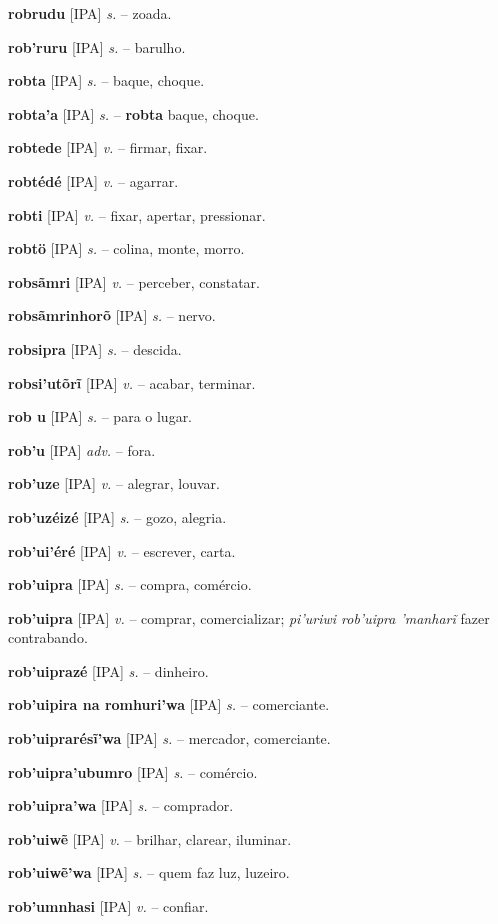 \textbf{robrudu} [IPA] \textit{s.} -- zoada.

\textbf{rob'ruru} [IPA] \textit{s.} -- barulho.

\textbf{robta} [IPA] \textit{s.} -- baque, choque.

\textbf{robta'a} [IPA] \textit{s.} -- \textbf{robta} baque, choque.

\textbf{robtede} [IPA] \textit{v.} -- firmar, fixar.

\textbf{robtédé} [IPA] \textit{v.} -- agarrar.

\textbf{robti} [IPA] \textit{v.} -- fixar, apertar, pressionar.

\textbf{robtö} [IPA] \textit{s.} -- colina, monte, morro.

\textbf{robsãmri} [IPA] \textit{v.} -- perceber, constatar.

\textbf{robsãmrinhorõ} [IPA] \textit{s.} -- nervo.

\textbf{robsipra} [IPA] \textit{s.} -- descida.

\textbf{robsi'utõrĩ} [IPA] \textit{v.} -- acabar, terminar.

\textbf{rob u} [IPA] \textit{s.} -- para o lugar.

\textbf{rob'u} [IPA] \textit{adv.} -- fora.

\textbf{rob'uze} [IPA] \textit{v.} -- alegrar, louvar.

\textbf{rob'uzéizé} [IPA] \textit{s.} -- gozo, alegria.

\textbf{rob'ui'éré} [IPA] \textit{v.} -- escrever, carta.

\textbf{rob'uipra} [IPA] \textit{s.} -- compra, comércio.

\textbf{rob'uipra} [IPA] \textit{v.} -- comprar, comercializar; \textit{pi'uriwi rob'uipra 'manharĩ} fazer contrabando.

\textbf{rob'uiprazé} [IPA] \textit{s.} -- dinheiro.

\textbf{rob'uipira na romhuri'wa} [IPA] \textit{s.} -- comerciante.

\textbf{rob'uiprarésĩ'wa} [IPA] \textit{s.} -- mercador, comerciante.

\textbf{rob'uipra'ubumro} [IPA] \textit{s.} -- comércio.

\textbf{rob'uipra'wa} [IPA] \textit{s.} -- comprador.

\textbf{rob'uiwẽ} [IPA] \textit{v.} -- brilhar, clarear, iluminar.

\textbf{rob'uiwẽ'wa} [IPA] \textit{s.} -- quem faz luz, luzeiro.

\textbf{rob'umnhasi} [IPA] \textit{v.} -- confiar.

